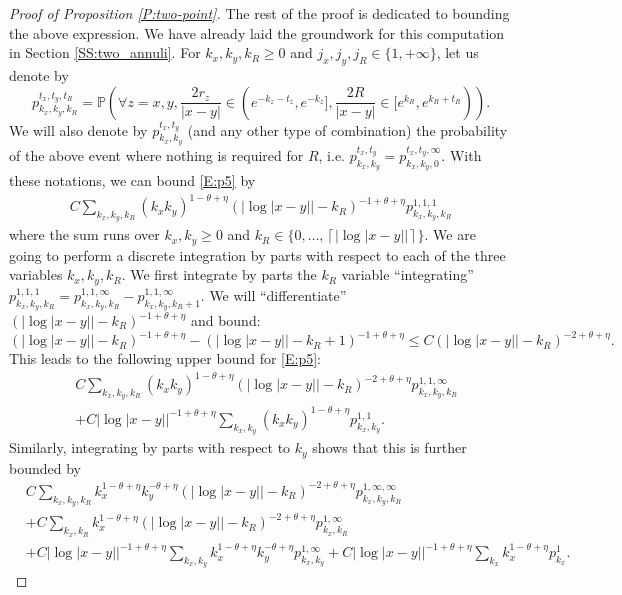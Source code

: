 \documentclass[11pt]{article}
\theoremstyle{remark}
\newcommand{\Prob}[1]{\mathbb{P} \left( #1 \right) }
\newcommand{\ceil}[1]{\left\lceil #1 \right\rceil}
\numberwithin{equation}{section}
\begin{document}
\begin{proof}[Proof of Proposition \ref{P:two-point}]
The rest of the proof is dedicated to bounding the above expression. We have already laid the groundwork for this computation in Section \ref{SS:two_annuli}.
For $k_x, k_y, k_R \geq 0$ and $j_x, j_y, j_R \in \{1, +\infty\}$, let us denote by
\[
p_{k_x,k_y,k_R}^{t_x,t_y,t_R} = \Prob{ \forall z = x,y, \frac{2r_z}{|x-y|} \in (e^{-k_z-t_z},e^{-k_z}], \frac{2R}{|x-y|} \in [e^{k_R}, e^{k_R+t_R}) }.
\]
We will also denote by $p_{k_x,k_y}^{t_x,t_y}$ (and any other type of combination) the probability of the above event where nothing is required for $R$, i.e. $p_{k_x,k_y}^{t_x,t_y} = p_{k_x,k_y,0}^{t_x,t_y,\infty}$. With these notations, we can bound \eqref{E:p5} by
\begin{align*}
C \sum_{k_x,k_y,k_R} (k_xk_y)^{1-\theta+\eta} ( |\log |x-y|| - k_R)^{-1+\theta + \eta}
p_{k_x,k_y,k_R}^{1,1,1}
\end{align*}
where the sum runs over $k_x, k_y \geq 0$ and $k_R \in \{0, \dots, \ceil{|\log |x-y||}\}$. We are going to perform a discrete integration by parts with respect to each of the three variables $k_x, k_y, k_R$. We first integrate by parts the $k_R$ variable ``integrating'' $p_{k_x,k_y,k_R}^{1,1,1} = p_{k_x,k_y,k_R}^{1,1,\infty} - p_{k_x,k_y,k_R+1}^{1,1,\infty}$. We will ``differentiate'' $( |\log |x-y|| - k_R)^{-1+\theta + \eta}$ and bound:
\[
( |\log |x-y|| - k_R)^{-1+\theta + \eta} - ( |\log |x-y|| - k_R+1)^{-1+\theta + \eta} \leq C ( |\log |x-y|| - k_R)^{-2+\theta + \eta}.
\]
This leads to the following upper bound for \eqref{E:p5}:
\begin{align*}
& C \sum_{k_x,k_y,k_R} (k_xk_y)^{1-\theta+\eta} ( |\log |x-y|| - k_R )^{-2+\theta + \eta} p_{k_x,k_y,k_R}^{1,1,\infty} \\
& + C |\log|x-y||^{-1+\theta+\eta} \sum_{k_x,k_y} (k_xk_y)^{1-\theta+\eta} p_{k_x,k_y}^{1,1}.
\end{align*}
Similarly, integrating by parts with respect to $k_y$ shows that this is further bounded by
\begin{align*}
& C \sum_{k_x,k_y,k_R} k_x^{1-\theta+\eta} k_y^{-\theta+\eta} ( |\log |x-y|| - k_R )^{-2+\theta + \eta} p_{k_x,k_y,k_R}^{1,\infty,\infty} \\
& + C \sum_{k_x,k_R} k_x^{1-\theta+\eta} ( |\log |x-y|| - k_R )^{-2+\theta + \eta} p_{k_x,k_R}^{1,\infty} \\
& + C |\log|x-y||^{-1+\theta+\eta} \sum_{k_x,k_y} k_x^{1-\theta+\eta} k_y^{-\theta+\eta} p_{k_x,k_y}^{1,\infty} + C |\log|x-y||^{-1+\theta+\eta} \sum_{k_x} k_x^{1-\theta+\eta} p_{k_x}^{1}.
\end{align*}

\end{proof}
\end{document}
